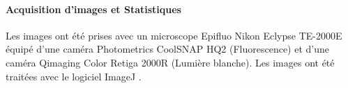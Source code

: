 \paragraph{Acquisition d'images et Statistiques}
\label{par:ImagesStats}
	Les images ont été prises avec un microscope Epifluo Nikon Eclypse TE-2000E équipé d'une caméra Photometrics CoolSNAP HQ2 (Fluorescence) et d'une caméra Qimaging Color Retiga 2000R (Lumière blanche).
	Les images ont été traitées avec le logiciel ImageJ \cite{Schneider2012}.